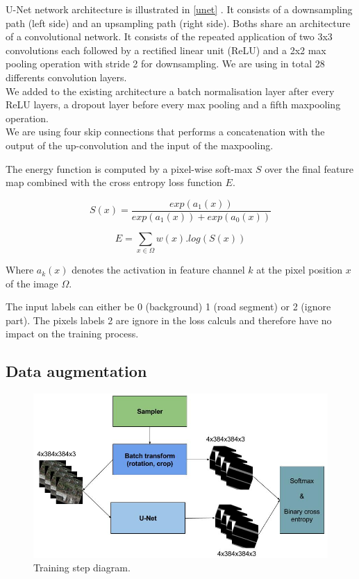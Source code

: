 \documentclass[10pt,conference,compsocconf]{IEEEtran}
\begin{document}
U-Net network architecture is illustrated in \ref{unet} . It consists of a downsampling path (left side) and an upsampling path (right side). Boths share an architecture of a convolutional network. It consists of the repeated application of two 3x3 convolutions each followed by a rectified linear unit (ReLU) and a 2x2 max pooling operation with stride 2 for downsampling. We are using in total 28 differents convolution layers.\\

We added to the existing architecture a batch normalisation layer after every ReLU layers, a dropout layer before every max pooling and a fifth maxpooling operation.\\

We are using four skip connections that performs a concatenation with the output of the up-convolution and the input of the maxpooling.

The energy function is computed by a pixel-wise soft-max $S$ over the final feature map combined with the cross entropy loss function $E$.

\begin{equation}
	S(x) = \frac{exp(a_1(x))}{exp(a_1(x))+exp(a_0(x))}
\end{equation}

\begin{equation}
	E = \sum\limits_{x \in \Omega} w(x).log(S(x))
\end{equation}

Where $a_k(x)$ denotes the activation in feature channel $k$ at the pixel position $x$ of the image $\Omega$.

The input labels can either be 0 (background) 1 (road segment) or 2 (ignore part). The pixels labels 2 are ignore in the loss calculs and therefore have no impact on the training process.
\subsection{Data augmentation}

\begin{figure}[h]
 \centering
 \includegraphics[width=0.7\columnwidth]{img/dataaug.png}
 \caption{Training step diagram.}
 \vspace{-3mm}
 \label{fig:denoise-fourier}
\end{figure}
\end{document}
